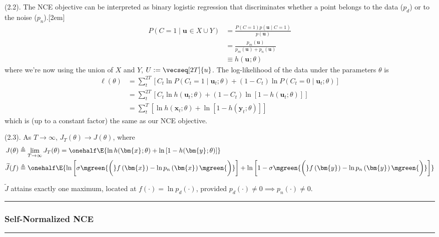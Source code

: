 \documentclass[11pt]{article}
\renewcommand\vec[2][]{\bm{#2}_{#1}}
\newcommand\myspace[1][]{\vspace{#1\bigskipamount}}
\newcommand\p{\Needspace{10\baselineskip} \noindent}
\newcommand\subsub[1]{\Needspace{15\baselineskip}\hrule\subsubsection{#1}\hrule}
\begin{document}
\myspace
\p {} (2.2). The NCE objective can be interpreted as binary logistic regression that discriminates whether a point belongs to the data ($p_d$) or to the noise ($p_n$).[2em]
\begin{align}
	P(C{=}1 \mid \vec u \in X \cup Y)
		&= \frac{ P(C{=1}) p(\vec u \mid C{=}1) }{  p(\vec u) } \\
		&= \frac{  p_m(\vec u) }{   p_m(\vec u) + p_n(\vec u)  } \\
		&\equiv h(\vec u; \theta)
\end{align}
where we're now using the union of $X$ and $Y$, $U := \vecseq[2T]{u}$. The log-likelihood of the data under the parameters $\theta$ is
\begin{align}
	\ell(\theta)
		&= \sum_t^{2T} \left[
			C_t \ln P(C_t{=}1 \mid \vec[t]{u};\theta) 
			+ (1 - C_t) \ln P(C_t{=}0 \mid \vec[t]{u} ; \theta) \right] \\
		&= \sum_t^{2T} \left[
			C_t \ln h(\vec[t]{u}; \theta)
			+ (1 - C_t) \ln \left[ 1 - h(\vec[t]{u}; \theta)  \right] \right] \\
		&= \sum_t^T \left[
				\ln h(\vec[t]{x}; \theta)
			+ \ln \left[ 1 - h(\vec[t]{y}; \theta)  \right]
		\right]
\end{align}
which is (up to a constant factor) the same as our NCE objective.


\myspace
\p {} (2.3). As $T \rightarrow \infty$, $J_T(\theta) \rightarrow J(\theta)$, where
\begin{align}
	J(\theta) 
		&\triangleq \lim_{T \rightarrow \infty} J_T(\theta)
		= \onehalf \E{\ln h(\vec x; \theta)     +    \ln\left[1 -  h(\vec y; \theta) \right]  } \\
	\widetilde{J}(f)
		&\triangleq \onehalf \E{ 
			   \ln\left[   \sigma \mgreen{ \bigg( }  f\left(\vec x\right) - \ln p_n\left( \vec x \right)  \mgreen{ \bigg) }   \right] 
			+ \ln\left[  1 -  \sigma \mgreen{ \bigg( }  f\left(\vec y\right) - \ln p_n\left( \vec y \right)   \mgreen{ \bigg) }  \right]    }
\end{align}
\begin{definition}[-1em][Theorem 1]
	$\widetilde J$ attains exactly one maximum, located at $f(\cdot) = \ln p_d(\cdot)$, provided $p_d(\cdot){\ne}0 \implies p_n(\cdot){\ne}0$. 
\end{definition}




\subsub{Self-Normalized NCE}
\end{document}
